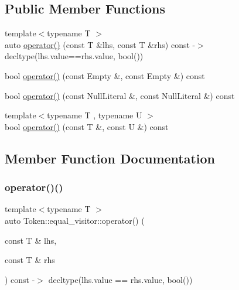 \subsection*{Public Member Functions}
\begin{DoxyCompactItemize}
\item 
{\footnotesize template$<$typename T $>$ }\\auto \hyperlink{struct_token_1_1equal__visitor_a22bf1a085ca9392c7be2d6a11f07afa5}{operator()} (const T \&lhs, const T \&rhs) const -\/$>$ decltype(lhs.\+value==rhs.\+value, bool())
\item 
bool \hyperlink{struct_token_1_1equal__visitor_a967ea3398b97e8e1af5e52384d5e92f2}{operator()} (const Empty \&, const Empty \&) const
\item 
bool \hyperlink{struct_token_1_1equal__visitor_adcfaf40afbf658dcedcf672c5f94b15d}{operator()} (const Null\+Literal \&, const Null\+Literal \&) const
\item 
{\footnotesize template$<$typename T , typename U $>$ }\\bool \hyperlink{struct_token_1_1equal__visitor_abd104c4e966e4c0e6d43991816f17118}{operator()} (const T \&, const U \&) const
\end{DoxyCompactItemize}


\subsection{Member Function Documentation}
\mbox{\label{struct_token_1_1equal__visitor_a22bf1a085ca9392c7be2d6a11f07afa5}} 
\subsubsection{\texorpdfstring{operator()()}{operator()()}\hspace{0.1cm}{\footnotesize\ttfamily [1/4]}}
{\footnotesize\ttfamily template$<$typename T $>$ \\
auto Token\+::equal\+\_\+visitor\+::operator() (\begin{DoxyParamCaption}\item[{const T \&}]{lhs,  }\item[{const T \&}]{rhs }\end{DoxyParamCaption}) const -\/$>$ decltype(lhs.\+value == rhs.\+value, bool())
  \hspace{0.3cm}{\ttfamily [inline]}}

